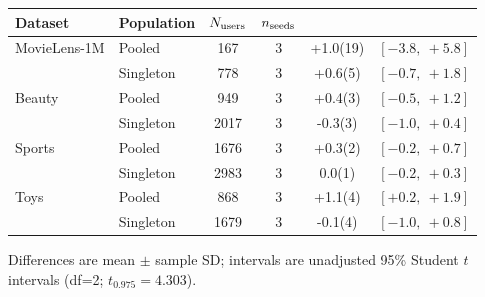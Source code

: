 \begin{table}[!htbp]
\begin{tabular*}{\textwidth}{@{\extracolsep{\fill}}llS[table-format=4.0]S[table-format=1.0]S[table-format=+2.1(3)]r@{}}
\toprule
Dataset & Population & {$N_{\rm users}$} & {$n_{\rm seeds}$} & {} & {}\\
\midrule
MovieLens-1M & Pooled & 167 & 3 & +1.0(19) & \([-3.8,\ +5.8]\)\\ %
 & Singleton & 778 & 3 & +0.6(5) & \([-0.7,\ +1.8]\)\\ %
\midrule
Beauty & Pooled & 949 & 3 & +0.4(3) & \([-0.5,\ +1.2]\)\\ %
 & Singleton & 2017 & 3 & -0.3(3) & \([-1.0,\ +0.4]\)\\ %
\midrule
Sports & Pooled & 1676 & 3 & +0.3(2) & \([-0.2,\ +0.7]\)\\ %
 & Singleton & 2983 & 3 & 0.0(1) & \([-0.2,\ +0.3]\)\\ %
\midrule
Toys & Pooled & 868 & 3 & +1.1(4) & \([+0.2,\ +1.9]\)\\ %
 & Singleton & 1679 & 3 & -0.1(4) & \([-1.0,\ +0.8]\)\\ %
\bottomrule
\end{tabular*}
\par\smallskip\noindent\begin{minipage}{\textwidth}\fontsize{8.5}{11}\selectfont Differences are mean $\pm$ sample SD; intervals are unadjusted 95\% Student $t$ intervals (df=2; $t_{0.975}=4.303$).
\end{minipage}
\end{table}
